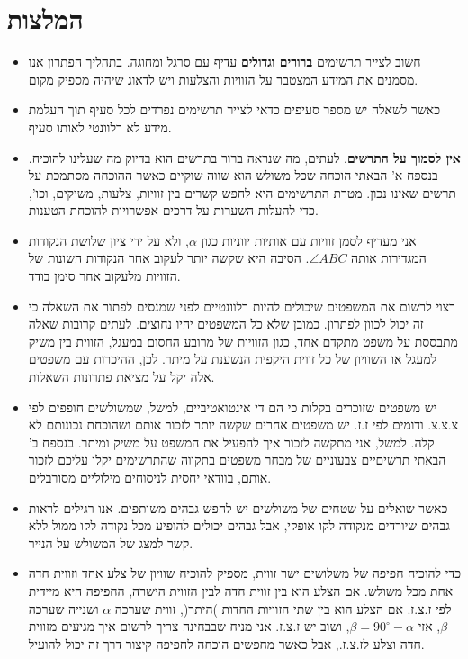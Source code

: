 

\np

\section{המלצות}

\begin{itemize}
\item
חשוב לצייר תרשימים 
\textbf{ברורים וגדולים}
עדיף עם סרגל ומחוגה. בתהליך הפתרון אנו מסמנים את המידע המצטבר על הזוויות והצלעות ויש לדאוג שיהיה מספיק מקום.
\item
כאשר לשאלה יש מספר סעיפים כדאי לצייר תרשימים נפרדים לכל סעיף תוך העלמת מידע לא רלוונטי לאותו סעיף.

\item
\textbf{אין לסמוך על התרשים}.
לעתים, מה שנראה ברור בתרשים הוא בדיוק מה שעלינו להוכיח. בנספח א' הבאתי הוכחה שכל משולש הוא שווה שוקיים כאשר ההוכחה מסתמכת על תרשים שאינו נכון. מטרת התרשימים היא לחפש קשרים בין זוויות, צלעות, משיקים, וכו', כדי להעלות השערות על דרכים אפשרויות להוכחת הטענות.

\item
אני מעדיף לסמן זוויות עם אותיות יווניות כגון
$\alpha$,
ולא על ידי ציון שלושת הנקודות המגדירות אותה
$\angle ABC$.
הסיבה היא שקשה יותר לעקוב אחר הנקודות השונות של הזוויות מלעקוב אחר סימן בודד.

\item
רצוי לרשום את המשפטים שיכולים להיות רלוונטיים לפני שמנסים לפתור את השאלה כי זה יכול לכוון לפתרון. כמובן שלא כל המשפטים יהיו נחוצים. לעתים קרובות שאלה מתבססת על משפט מתקדם אחד, כגון הזוויות של מרובע החסום במעגל, הזווית בין משיק למעגל או השוויון של כל זווית היקפית הנשענת על מיתר. לכן, ההיכרות עם משפטים אלה יקל על מציאת פתרונות השאלות.

\item
יש משפטים שזוכרים בקלות כי הם די אינטואטיביים, למשל, שמשולשים חופפים לפי צ.צ.צ. ודומים לפי ז.ז. יש משפטים אחרים שקשה יותר לזכור אותם ושהוכחת נכונותם לא קלה. למשל, אני מתקשה לזכור איך להפעיל את המשפט על משיק ומיתר. בנספח ב' הבאתי תרשיםיים צבעוניים של מבחר משפטים בתקווה שהתרשימים יקלו עליכם לזכור אותם, בוודאי יחסית לניסוחים מילוליים מסורבלים.

\item
כאשר שואלים על שטחים של משולשים יש לחפש גבהים משותפים. אנו רגילים לראות גבהים שיורדים מנקודה לקו אופקי, אבל גבהים יכולים להופיע מכל נקודה לקו ממול ללא קשר למצג של המשולש על הנייר.

\item
כדי להוכיח חפיפה של משלושים ישר זווית, מספיק להוכיח שוויון של צלע אחד וזווית חדה אחת מכל משולש. אם הצלע הוא בין זווית חדה לבין הזווית הישרה, החפיפה היא מיידית לפי ז.צ.ז. אם הצלע הוא בין שתי הזוויות החדות )היתר(, זווית שערכה 
$\alpha$
ושנייה שערכה
$\beta$,
אזי
$\beta=90^\circ-\alpha$,
ושוב יש ז.צ.ז. אני מניח שבבחינה צריך לרשום איך מגיעים מזווית חדה וצלע לז.צ.ז., אבל כאשר מחפשים הוכחה לחפיפה קיצור דרך זה יכול להועיל.

\end{itemize}

